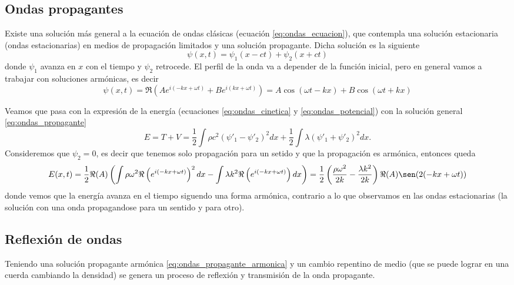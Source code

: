 \documentclass[a4paper]{article}
\numberwithin{equation}{section}
\begin{document}
		\subsection{Ondas propagantes}
			\label{sec:ondas_propagantes}
			Existe una solución más general a la ecuación de ondas clásicas (ecuación \ref{eq:ondas_ecuacion}), que contempla una solución estacionaria (ondas estacionarias) en medios de propagación limitados y una solución propagante. Dicha solución es la siguiente
			\begin{equation}
				\psi(x,t) = \psi_1(x - c t) + \psi_2(x + c t)
				\label{eq:ondas_propagante}
			\end{equation}
			donde $\psi_1$ avanza en $x$ con el tiempo y $\psi_2$ retrocede. El perfil de la onda va a depender de la función inicial, pero en general vamos a trabajar con soluciones armónicas, es decir
			\begin{equation}
				\psi(x,t) = \Re\left(A e^{i (-k x + \omega t)} + B e^{i (k x + \omega t)}\right) = A \cos(\omega t - k x) + B \cos(\omega t + k x)
				\label{eq:ondas_propagante_armonica}
			\end{equation}
			
			Veamos que pasa con la expresión de la energía (ecuaciones \ref{eq:ondas_cinetica} y \ref{eq:ondas_potencial}) con la solución general \ref{eq:ondas_propagante} 
			\[E = T +  V = \frac{1}{2} \int \rho c^2 (\psi'_1 - \psi'_2)^2 dx + \frac{1}{2} \int \lambda (\psi'_1 + \psi'_2)^2 dx.\] Consideremos que $\psi_2 = 0$, es decir que tenemos solo propagación para un setido y que la propagación es armónica, entonces queda 
			\begin{equation}
				E(x,t) = \frac{1}{2} \Re(A) \left( \int \rho \omega^2 \Re\left(e^{i (-k x + \omega t)}\right)^2 dx - \int \lambda k^2 \Re\left(e^{i (-k x + \omega t)}\right) dx \right) = \frac{1}{2} \left(\frac{\rho \omega^2}{2k}-\frac{\lambda k^2}{2k}\right) \Re(A) \sen(2(-kx + \omega t))
			\end{equation}
			donde vemos que la energía avanza en el tiempo siguendo una forma armónica, contrario a lo que observamos en las ondas estacionarias (la solución con una onda propagandose para un sentido y para otro).
			
		\subsection{Reflexión de ondas}
			\label{sec:ondas_reflexion}
			Teniendo una solución propagante armónica \ref{eq:ondas_propagante_armonica} y un cambio repentino de medio (que se puede lograr en una cuerda cambiando la densidad) se genera un proceso de reflexión y transmisión de la onda propagante.
			
\end{document}

